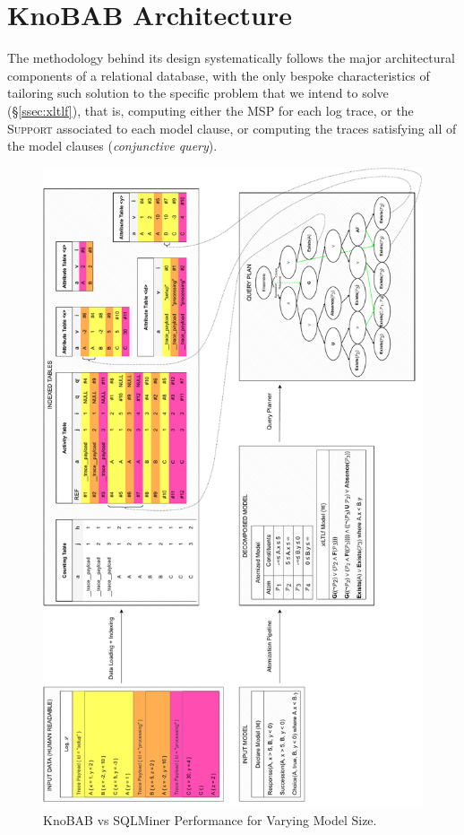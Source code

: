 \section{KnoBAB Architecture}\label{sec:karch}
The methodology behind its design systematically follows the major architectural components of a relational database, with the only bespoke characteristics of tailoring such solution to the specific problem that we intend to solve (\S\ref{ssec:xltlf}), that is, computing either the MSP for each log trace,  or the \textsc{Support} associated to each model clause, or computing the traces satisfying all of the model clauses (\textit{conjunctive query}).

\begin{figure}[!t]
	\centering
	\includegraphics[width=.7\textwidth]{images/knobab_pipeline.pdf}
	\caption{KnoBAB vs SQLMiner Performance for Varying Model Size.}\label{fig:vsSQL}
\end{figure}


